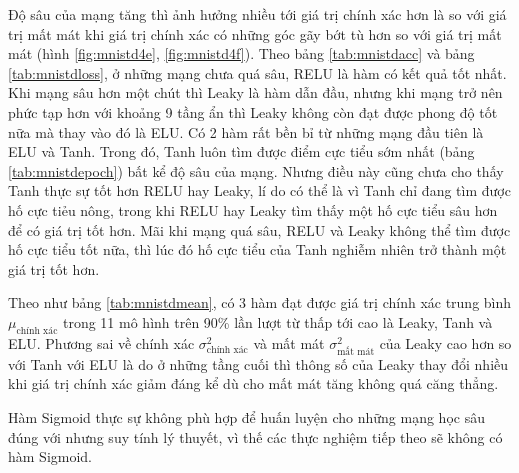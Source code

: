 Độ sâu của mạng tăng thì ảnh hưởng nhiều tới giá trị chính xác hơn là so với giá trị mất mát khi giá trị chính xác có những góc gãy bớt tù hơn so với giá trị mất mát (hình \ref{fig:mnistd4e}, \ref{fig:mnistd4f}).
Theo bảng \ref{tab:mnistdacc} và bảng \ref{tab:mnistdloss}, ở những mạng chưa quá sâu, RELU là hàm có kết quả tốt nhất.
Khi mạng sâu hơn một chút thì Leaky là hàm dẫn đầu, nhưng khi mạng trở nên phức tạp hơn với khoảng 9 tầng ẩn thì Leaky không còn đạt được phong độ tốt nữa mà thay vào đó là ELU.
Có 2 hàm rất bền bỉ từ những mạng đầu tiên là ELU và Tanh.
Trong đó, Tanh luôn tìm được điểm cực tiểu sớm nhất (bảng \ref{tab:mnistdepoch}) bất kể độ sâu của mạng.
Nhưng điều này cũng chưa cho thấy Tanh thực sự tốt hơn RELU hay Leaky, lí do có thể là vì Tanh chỉ đang tìm được hố cực tiẻu nông, trong khi RELU hay Leaky tìm thấy một hố cực tiểu sâu hơn để có giá trị tốt hơn.
Mãi khi mạng quá sâu, RELU và Leaky không thể tìm được hố cực tiểu tốt nữa, thì lúc đó hố cực tiểu của Tanh nghiễm nhiên trở thành một giá trị tốt hơn.
\vspace{5pt}

Theo như bảng \ref{tab:mnistdmean}, có 3 hàm đạt được giá trị chính xác trung bình $\mu_{\text{chính xác}}$ trong 11 mô hình trên 90\% lần lượt từ thấp tới cao là Leaky, Tanh và ELU.
Phương sai về chính xác $\sigma^2_{\text{chính xác}}$ và mất mát $\sigma^2_{\text{mất mát}}$ của Leaky cao hơn so với Tanh với ELU là do ở những tầng cuối thì thông số của Leaky thay đổi nhiều khi giá trị chính xác giảm đáng kể dù cho mất mát tăng không quá căng thẳng.
\vspace{5pt}

Hàm Sigmoid thực sự không phù hợp để huấn luyện cho những mạng học sâu đúng với nhưng suy tính lý thuyết, vì thế các thực nghiệm tiếp theo sẽ không có hàm Sigmoid.


